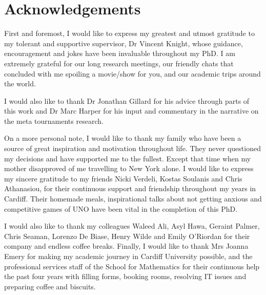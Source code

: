 \chapter{Acknowledgements}

First and foremost, I would like to express my greatest and utmost gratitude to
my tolerant and supportive supervisor, Dr Vincent Knight, whose guidance,
encouragement and jokes have been invaluable throughout my PhD. I am extremely
grateful for our long research meetings, our friendly chats that concluded with
me spoiling a movie/show for you, and our academic trips around the world.

I would also like to thank Dr Jonathan Gillard for his advice through parts of
this work and Dr Marc Harper for his input and commentary in the narrative on
the meta tournaments research.

On a more personal note, I would like to thank my family who have been a source
of great inspiration and motivation throughout life. They never questioned my
decisions and have supported me to the fullest. Except that time when my mother
disapproved of me travelling to New York alone.  I would like to express  my
sincere gratitude to my friends Nicki Verdeli, Kostas Soulanis and Chris
Athanasiou, for their continuous support and friendship throughout my years in
Cardiff. Their homemade meals, inspirational talks about not getting anxious and
competitive games of UNO have been vital in the completion of this PhD. 

I would also like to thank my colleagues Waleed Ali, Asyl Hawa, Geraint Palmer,
Chris Seaman, Lorenzo De Biase, Henry Wilde and Emily O'Riordan for their
company and endless coffee breaks. Finally, I would like to thank Mrs Joanna
Emery for making my academic journey in Cardiff University possible, and the
professional services staff of the School for Mathematics for their continuous
help the past four years with filling forms, booking rooms, resolving IT issues
and preparing coffee and biscuits.